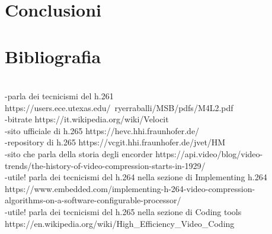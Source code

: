 \documentclass[a4paper,12pt, oneside]{article}
\begin{document}
\section{Conclusioni}

\section{Bibliografia}
\\-parla dei tecnicismi del h.261 https://users.ece.utexas.edu/~ryerraballi/MSB/pdfs/M4L2.pdf
\\-bitrate https://it.wikipedia.org/wiki/Velocit%
\\-sito ufficiale di h.265 https://hevc.hhi.fraunhofer.de/
\\-repository di h.265 https://vcgit.hhi.fraunhofer.de/jvet/HM
\\-sito che parla della storia degli encorder https://api.video/blog/video-trends/the-history-of-video-compression-starts-in-1929/
\\-utile! parla dei tecnicismi del h.264 nella sezione di Implementing h.264 https://www.embedded.com/implementing-h-264-video-compression-\\algorithms-on-a-software-configurable-processor/
\\-utile! parla dei tecnicismi del h.265 nella sezione di Coding tools https://en.wikipedia.org/wiki/High_Efficiency_Video_Coding
\end{document}
